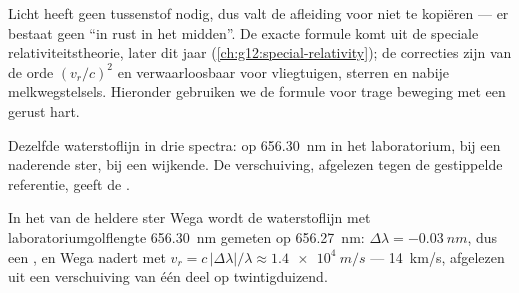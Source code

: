 \begin{remark}\label{rem:g12:doppler-effect:honest}
Licht heeft geen tussenstof nodig, dus valt de afleiding voor  niet
te kopiëren --- er bestaat geen ``in rust in het midden''. De exacte
formule komt uit de speciale relativiteitstheorie, later dit jaar
(\cref{ch:g12:special-relativity}); de correcties zijn van de orde
$(v_r/c)^2$ en verwaarloosbaar voor vliegtuigen, sterren en nabije
melkwegstelsels. Hieronder gebruiken we de formule voor trage beweging met
een gerust hart.
\end{remark}

\begin{omfigure}

{\small Dezelfde waterstoflijn in drie spectra: op \qty{656.30}{nm} in het
laboratorium,  bij een naderende ster,  bij
een wijkende. De verschuiving, afgelezen tegen de gestippelde referentie,
geeft de .}
\end{omfigure}

\begin{example}\label{ex:g12:doppler-effect:vega}
In het  van de heldere ster Wega wordt de waterstoflijn met
laboratoriumgolflengte \qty{656.30}{nm} gemeten op \qty{656.27}{nm}:
$\Delta\lambda = \qty{-0.03}{nm}$, dus een , en Wega
nadert met $v_r = c\,|\Delta\lambda|/\lambda \approx \qty{1.4e4}{m/s}$ ---
\qty{14}{km/s}, afgelezen uit een verschuiving van één deel op
twintigduizend.
\end{example}

